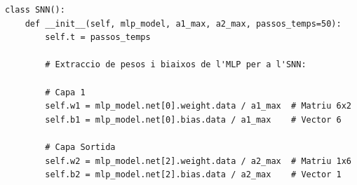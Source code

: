 \documentclass[a4paper,11pt, titlepage, twoside]{article}
\begin{document}
\vspace{3mm}
\begin{lstlisting}[style=codi, caption={Fragment de la implementacio de la classe SNN utilitzada i conversió de pesos i biaixos de l'ANN a l'SNN}, captionpos = b, label={lst:Normalitzacio_pesos}, firstnumber=57]
class SNN():
    def __init__(self, mlp_model, a1_max, a2_max, passos_temps=50):
        self.t = passos_temps
        
        # Extraccio de pesos i biaixos de l'MLP per a l'SNN:
        
        # Capa 1
        self.w1 = mlp_model.net[0].weight.data / a1_max  # Matriu 6x2
        self.b1 = mlp_model.net[0].bias.data / a1_max    # Vector 6
        
        # Capa Sortida
        self.w2 = mlp_model.net[2].weight.data / a2_max  # Matriu 1x6
        self.b2 = mlp_model.net[2].bias.data / a2_max    # Vector 1

\end{lstlisting}
\end{document}
